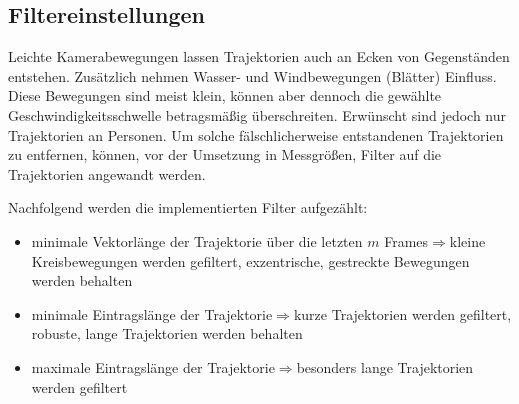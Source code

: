 


\subsection{Filtereinstellungen}
Leichte Kamerabewegungen lassen Trajektorien auch an Ecken von Gegenständen entstehen. Zusätzlich nehmen Wasser- und Windbewegungen (\zb Blätter) Einfluss. Diese Bewegungen sind meist klein, können aber dennoch die gewählte Geschwindigkeitsschwelle betragsmäßig überschreiten. Erwünscht sind jedoch nur Trajektorien an Personen. Um solche fälschlicherweise entstandenen Trajektorien zu entfernen, können, vor der Umsetzung in Messgrößen, Filter auf die Trajektorien angewandt werden.

Nachfolgend werden die implementierten Filter aufgezählt:

\begin{itemize}
    \item minimale Vektorlänge der Trajektorie über die letzten $m$ Frames$\Rightarrow$kleine Kreisbewegungen werden gefiltert, exzentrische, gestreckte Bewegungen werden behalten
    \item minimale Eintragslänge der Trajektorie$\Rightarrow$kurze Trajektorien werden gefiltert, robuste, lange Trajektorien werden behalten
    \item maximale Eintragslänge der Trajektorie$\Rightarrow$besonders lange Trajektorien werden gefiltert 
\end{itemize}

